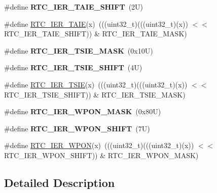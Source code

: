 \begin{DoxyCompactItemize}
\#define {\bfseries R\+T\+C\+\_\+\+I\+E\+R\+\_\+\+T\+A\+I\+E\+\_\+\+S\+H\+I\+FT}~(2\+U)
\item 
\#define \mbox{\hyperlink{group___r_t_c___register___masks_ga0c84f648183b728883a6f14d6e1e36c6}{R\+T\+C\+\_\+\+I\+E\+R\+\_\+\+T\+A\+IE}}(x)~(((uint32\+\_\+t)(((uint32\+\_\+t)(x)) $<$$<$ R\+T\+C\+\_\+\+I\+E\+R\+\_\+\+T\+A\+I\+E\+\_\+\+S\+H\+I\+FT)) \& R\+T\+C\+\_\+\+I\+E\+R\+\_\+\+T\+A\+I\+E\+\_\+\+M\+A\+SK)
\item 
\mbox{\label{group___r_t_c___register___masks_ga63c8ae5db82845d5bb13907cd0e70cd7}} 
\#define {\bfseries R\+T\+C\+\_\+\+I\+E\+R\+\_\+\+T\+S\+I\+E\+\_\+\+M\+A\+SK}~(0x10\+U)
\item 
\mbox{\label{group___r_t_c___register___masks_ga456ec6fb31112c122b38dcc586d9e75d}} 
\#define {\bfseries R\+T\+C\+\_\+\+I\+E\+R\+\_\+\+T\+S\+I\+E\+\_\+\+S\+H\+I\+FT}~(4\+U)
\item 
\#define \mbox{\hyperlink{group___r_t_c___register___masks_ga1bc67a85a822b7ad9ddb5aca49634471}{R\+T\+C\+\_\+\+I\+E\+R\+\_\+\+T\+S\+IE}}(x)~(((uint32\+\_\+t)(((uint32\+\_\+t)(x)) $<$$<$ R\+T\+C\+\_\+\+I\+E\+R\+\_\+\+T\+S\+I\+E\+\_\+\+S\+H\+I\+FT)) \& R\+T\+C\+\_\+\+I\+E\+R\+\_\+\+T\+S\+I\+E\+\_\+\+M\+A\+SK)
\item 
\mbox{\label{group___r_t_c___register___masks_gae08d5bcb3d71bb932a7c1d41086b3545}} 
\#define {\bfseries R\+T\+C\+\_\+\+I\+E\+R\+\_\+\+W\+P\+O\+N\+\_\+\+M\+A\+SK}~(0x80\+U)
\item 
\mbox{\label{group___r_t_c___register___masks_gaa18422218526a3bb50a3158c3aee2100}} 
\#define {\bfseries R\+T\+C\+\_\+\+I\+E\+R\+\_\+\+W\+P\+O\+N\+\_\+\+S\+H\+I\+FT}~(7\+U)
\item 
\#define \mbox{\hyperlink{group___r_t_c___register___masks_ga9cfc0e9a7e1a84c019ed8cde67c963d2}{R\+T\+C\+\_\+\+I\+E\+R\+\_\+\+W\+P\+ON}}(x)~(((uint32\+\_\+t)(((uint32\+\_\+t)(x)) $<$$<$ R\+T\+C\+\_\+\+I\+E\+R\+\_\+\+W\+P\+O\+N\+\_\+\+S\+H\+I\+FT)) \& R\+T\+C\+\_\+\+I\+E\+R\+\_\+\+W\+P\+O\+N\+\_\+\+M\+A\+SK)
\end{DoxyCompactItemize}


\subsection{Detailed Description}



